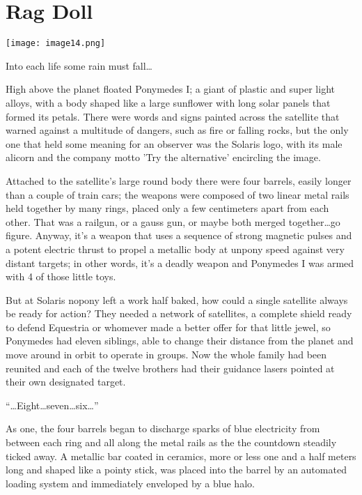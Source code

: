 \chapter{Rag Doll}

\texttt{[image: image14.png]}

\begin{intro}
    Into each life some rain must fall\dots
\end{intro}


High above the planet floated Ponymedes I; a giant of plastic and super light alloys, with a body shaped like a large sunflower with long solar panels that formed its petals. There were words and signs painted across the satellite that warned against a multitude of dangers, such as fire or falling rocks, but the only one that held some meaning for an observer was the Solaris logo, with its male alicorn and the company motto 'Try the alternative' encircling the image.

Attached to the satellite's large round body there were four barrels, easily longer than a couple of train cars; the weapons were composed of two linear metal rails held together by many rings, placed only a few centimeters apart from each other. That was a railgun, or a gauss gun, or maybe both merged together\dots go figure. Anyway, it's a weapon that uses a sequence of strong magnetic pulses and a potent electric thrust to propel a metallic body at unpony speed against very distant targets; in other words, it's a deadly weapon and Ponymedes I was armed with 4 of those little toys.

But at Solaris nopony left a work half baked, how could a single satellite always be ready for action? They needed a network of satellites, a complete shield ready to defend Equestria or whomever made a better offer for that little jewel, so Ponymedes had eleven siblings, able to change their distance from the planet and move around in orbit to operate in groups. Now the whole family had been reunited and each of the twelve brothers had their guidance lasers pointed at their own designated target.

``{\mt \dots Eight\dots seven\dots six\dots}''

As one, the four barrels began to discharge sparks of blue electricity from between each ring and all along the metal rails as the the countdown steadily ticked away. A metallic bar coated in ceramics, more or less one and a half meters long and shaped like a pointy stick, was placed into the barrel by an automated loading system and immediately enveloped by a blue halo.

